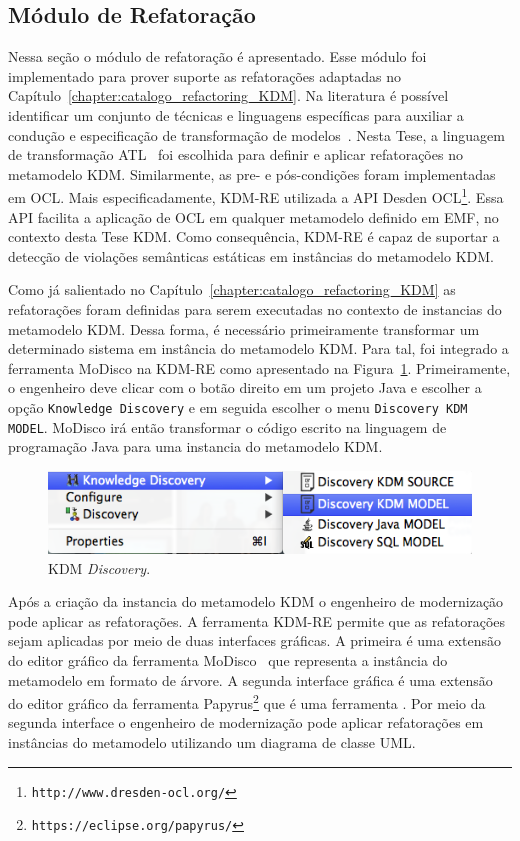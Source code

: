 \subsection{Módulo de Refatoração}

Nessa seção o módulo de refatoração é apresentado. Esse módulo foi implementado para prover suporte as refatorações adaptadas no Capítulo~\ref{chapter:catalogo_refactoring_KDM}. Na literatura é possível identificar um conjunto de técnicas e linguagens específicas para auxiliar a condução e especificação de transformação de modelos~\cite{Biehl_2010, Mens_2006, Allilaire_06}. Nesta Tese, a linguagem de transformação ATL~\cite{ATL_eclipse,Jouault_2008} foi escolhida para definir e aplicar refatorações no metamodelo KDM. Similarmente, as pre- e pós-condições foram implementadas em OCL. Mais especificadamente, KDM-RE utilizada a API Desden OCL\footnote{\texttt{http://www.dresden-ocl.org/}}. Essa API facilita a aplicação de OCL em qualquer metamodelo definido em EMF, no contexto desta Tese KDM. Como consequência, KDM-RE é capaz de suportar a detecção de violações semânticas estáticas em instâncias do metamodelo KDM.


Como já salientado no Capítulo~\ref{chapter:catalogo_refactoring_KDM} as refatorações foram definidas para serem executadas no contexto de instancias do metamodelo KDM. Dessa forma, é necessário primeiramente transformar um determinado sistema em instância do metamodelo KDM. Para tal, foi integrado a ferramenta MoDisco na KDM-RE como apresentado na Figura~\ref{fig:kdm_modisco_discovery}. Primeiramente, o engenheiro deve clicar com o botão direito em um projeto Java e escolher a opção \texttt{Knowledge Discovery} e em seguida escolher o menu \texttt{Discovery KDM MODEL}. MoDisco irá então transformar o código escrito na linguagem de programação Java para uma instancia do metamodelo KDM. 

\begin{figure}[h]
	\centering
	\caption{KDM \textit{Discovery}.}
	\label{fig:kdm_modisco_discovery}
	\includegraphics[scale=0.65]{images/kdm_discovery_kdm_re}
	\fautor
\end{figure}

Após a criação da instancia do metamodelo KDM o engenheiro de modernização pode aplicar as refatorações. A ferramenta KDM-RE permite que as refatorações sejam aplicadas por meio de duas interfaces gráficas. A primeira é uma extensão do editor gráfico da ferramenta MoDisco~\cite{Bruneliere_2014} que representa a instância do metamodelo em formato de árvore. A segunda interface gráfica é uma extensão do editor gráfico da ferramenta Papyrus\footnote{\texttt{https://eclipse.org/papyrus/}} que é uma ferramenta . Por meio da segunda interface o engenheiro de modernização pode aplicar refatorações em instâncias do metamodelo utilizando um diagrama de classe UML.

